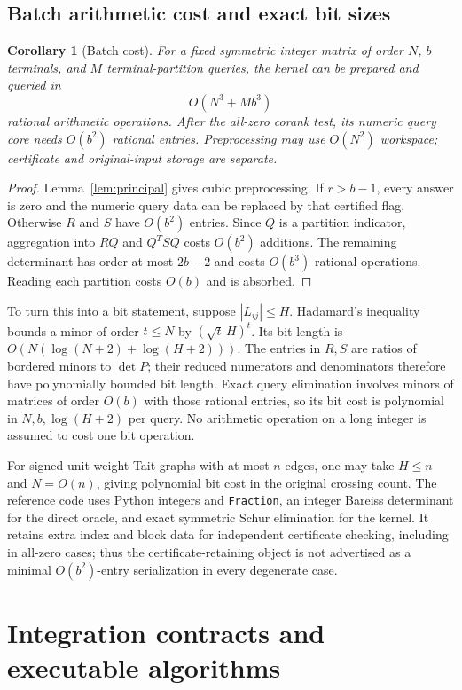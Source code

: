 \documentclass[11pt]{article}
\newtheorem{corollary}[theorem]{Corollary}
\theoremstyle{definition}
\theoremstyle{remark}
\newcommand{\code}[1]{\texttt{#1}}
\begin{document}
\subsection{Batch arithmetic cost and exact bit sizes}
\begin{corollary}[Batch cost]\label{cor:batch}
For a fixed symmetric integer matrix of order $N$, $b$ terminals, and $M$
terminal-partition queries, the kernel can be prepared and queried in
\[
 O(N^3+Mb^3)
\]
rational arithmetic operations. After the all-zero corank test, its numeric
query core needs $O(b^2)$ rational entries. Preprocessing may use $O(N^2)$
workspace; certificate and original-input storage are separate.
\end{corollary}
\begin{proof}
Lemma~\ref{lem:principal} gives cubic preprocessing. If $r>b-1$, every answer
is zero and the numeric query data can be replaced by that certified flag.
Otherwise $R$ and $S$ have $O(b^2)$ entries. Since $Q$ is a partition
indicator, aggregation into $RQ$ and $Q^TSQ$ costs $O(b^2)$ additions. The
remaining determinant has order at most $2b-2$ and costs $O(b^3)$ rational
operations. Reading each partition costs $O(b)$ and is absorbed.
\end{proof}

To turn this into a bit statement, suppose $|L_{ij}|\le H$. Hadamard's
inequality bounds a minor of order $t\le N$ by $(\sqrt t\,H)^t$. Its bit
length is $O(N(\log(N+2)+\log(H+2)))$. The entries in $R,S$ are ratios of
bordered minors to $\det P$; their reduced numerators and denominators
therefore have polynomially bounded bit length. Exact query elimination
involves minors of matrices of order $O(b)$ with those rational entries,
so its bit cost is polynomial in $N,b,\log(H+2)$ per query. No arithmetic
operation on a long integer is assumed to cost one bit operation.

For signed unit-weight Tait graphs with at most $n$ edges, one may take
$H\le n$ and $N=O(n)$, giving polynomial bit cost in the original crossing
count. The reference code uses Python integers and \code{Fraction}, an
integer Bareiss determinant for the direct oracle, and exact symmetric
Schur elimination for the kernel. It retains extra index and block data for
independent certificate checking, including in all-zero cases; thus the
certificate-retaining object is not advertised as a minimal $O(b^2)$-entry
serialization in every degenerate case.

\section{Integration contracts and executable algorithms}
\label{sec:integration}
\end{document}
